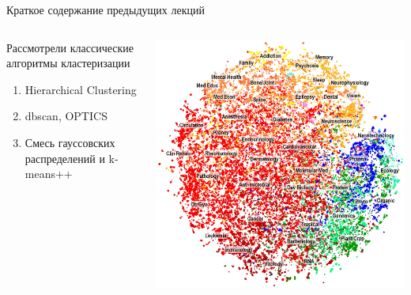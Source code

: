 \documentclass[aspectratio=169]{beamer}
\begin{document}
\begin{frame}{Краткое содержание предыдущих лекций}

\begin{columns}[]
    \begin{column}{.4\textwidth}
    	Рассмотрели классические алгоритмы кластеризации
		\begin{enumerate}
					\item Hierarchical Clustering
			\item dbscan, OPTICS
			\item Смесь гауссовских распределений и k-means++
		\end{enumerate}
		
    \end{column}
       
    \begin{column}{.6\textwidth}
    \vspace{-0em}
	\begin{center}
   		\includegraphics[width=\textwidth]{images/medical.png}
    \end{center}
    \end{column}
  \end{columns}

\end{frame}

\end{document}

